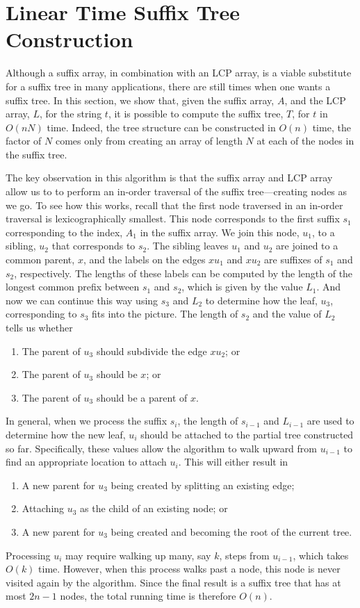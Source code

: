 \section{Linear Time Suffix Tree Construction}

Although a suffix array, in combination with an LCP array, is a viable substitute for a suffix tree in many applications, there are still times when one wants a suffix tree.  In this section, we show that, given the suffix array, $A$, and the LCP array, $L$, for the string $t$, it is possible to compute the suffix tree, $T$, for $t$ in $O(nN)$ time.  Indeed, the tree structure can be constructed in $O(n)$ time, the factor of $N$ comes only from creating an array of length $N$ at each of the nodes in the suffix tree.

The key observation in this algorithm is that the suffix array and LCP array allow us to to perform an in-order traversal of the suffix tree---creating nodes as we go.  To see how this works, recall that the first node traversed in an in-order traversal is lexicographically smallest.  This node corresponds to the first suffix $s_1$ corresponding to the index, $A_1$ in the suffix array.  We join this node, $u_1$, to a sibling, $u_2$ that corresponds to $s_2$.  The sibling leaves $u_1$ and $u_2$ are joined to a common parent, $x$, and the labels on the edges $xu_1$ and $xu_2$ are suffixes of $s_1$ and $s_2$, respectively.  The lengths of these labels can be computed by the length of the longest common prefix between $s_1$ and $s_2$, which is given by the value $L_1$.  And now we can continue this way using $s_3$ and $L_2$ to determine how the leaf, $u_3$, corresponding to $s_3$ fits into the picture.  The length of $s_2$ and the value of $L_2$ tells us whether 
\begin{enumerate}
  \item The parent of $u_3$ should subdivide the edge $xu_2$; or
  \item The parent of $u_3$ should be $x$; or
  \item The parent of $u_3$ should be a parent of $x$.
\end{enumerate}
In general, when we process the suffix $s_i$, the length of $s_{i-1}$ and $L_{i-1}$ are used to determine how the new leaf, $u_i$ should be attached to the partial tree constructed so far.  Specifically, these values allow the algorithm to walk upward from $u_{i-1}$ to find an appropriate location to attach $u_i$.  This will either result in 
\begin{enumerate}
  \item A new parent for $u_3$ being created by splitting an existing edge;
  \item Attaching $u_3$ as the child of an existing node; or
  \item A new parent for $u_3$ being created and becoming the root of the current tree.
\end{enumerate}
Processing $u_i$ may require walking up many, say $k$, steps from $u_{i-1}$, 
which takes $O(k)$ time. However, when this process walks past a node, this node is never visited again by the algorithm. Since the final result is a suffix tree that has at most $2n-1$ nodes, the total running time is therefore $O(n)$.

